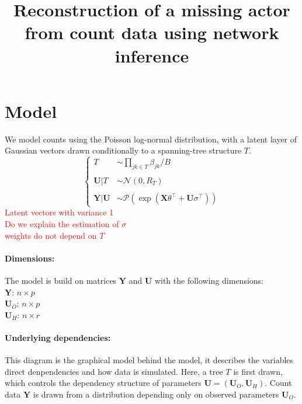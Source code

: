 \documentclass[11pt,a4paper]{article}
\title{Reconstruction of a missing actor from count data using network inference}
\newcommand{\Xbf}{\boldsymbol{X}}
\newcommand{\Ybf}{\boldsymbol{Y}}
\newcommand{\Ubf}{\boldsymbol{U}}
\newcommand{\edgeunit}{1.5}
\begin{document}
\maketitle
\vspace{3cm}
\tableofcontents
\newpage
\section{Model}
We model counts using the Poisson log-normal distribution, with a latent layer of Gaussian vectors drawn conditionally to a spanning-tree structure $T$. 
$$\left\{\begin{array}{rl}
T & \sim\prod_{jk \in T} \beta_{jk}/B \\\\
\Ubf |T& \sim\mathcal{N}(0,R_T)\\\\
\Ybf|\Ubf&\sim\mathcal{P}( \exp( \Xbf\theta^\intercal + \Ubf\sigma^\intercal) )
\end{array} \right.$$
\textcolor{red}{Latent vectors with variance 1\\
Do we explain the estimation of $\sigma$\\
weights do not depend on $T$}
\paragraph{Dimensions:}
The model is build on matrices $\Ybf$ and $\Ubf$ with the following dimensions:\\
$\Ybf$: $n\times p$\\
$\Ubf_O$: $n\times p$\\
$\Ubf_H$: $n\times r$


\paragraph{Underlying dependencies:} This diagram is the graphical model behind the model, it describes the variables direct denpendencies and how data is simulated. Here, a tree $T$ is first drawn, which controls the dependency structure of parameters $\Ubf = (\Ubf_O,\Ubf_H)$. Count data $\Ybf$ is drawn from a distribution depending only on observed parameters $\Ubf_O$.
\begin{center}
\end{center}
\end{document}

